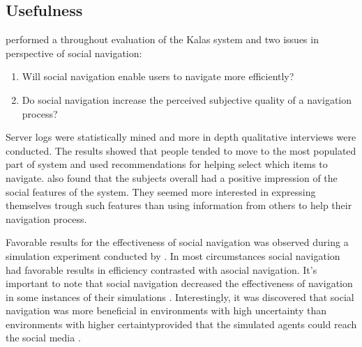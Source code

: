 \subsection{Usefulness}

\citet{svensson05} performed a throughout evaluation of the Kalas system and
two issues in perspective of social navigation:

\begin{enumerate}
  \item Will social navigation enable users to navigate more efficiently?
  \item Do social navigation increase the perceived subjective quality of
    a navigation process?
\end{enumerate}

Server logs were statistically mined and more in depth qualitative interviews
were conducted. The results showed that people tended to move to the most
populated part of system and used recommendations for helping select which
items to navigate. \citeauthor{svensson05} also found that the subjects
overall had a positive impression of the social features of the system. They
seemed more interested in expressing themselves trough such features than
using information from others to help their navigation process.

Favorable results for the effectiveness of social navigation was observed
during a simulation experiment conducted by \citeauthor{riedl03}. In most
circumstances social navigation had favorable results in efficiency contrasted
with asocial navigation. It's important to note that social navigation
decreased the effectiveness of navigation in some instances of their
simulations \citeyearpar[]{riedl03}.
Interestingly, it was discovered that social navigation was more
beneficial in environments with high uncertainty%
than environments with higher certainty\dash{}provided that the
simulated agents could reach the social media
\citeyearpar[]{riedl03}. 

